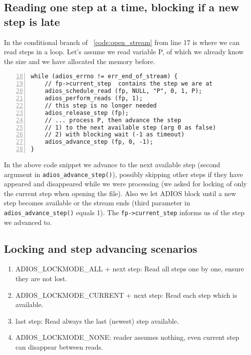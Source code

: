 \subsection{Reading one step at a time, blocking if a new step is late}
In the conditional branch of \lstlistingname~\ref{code:open_stream} from line 17 is where we can read steps in a loop. Let's assume we read variable P, of which we already know the size and we have allocated the memory before.

\begin{lstlisting}[numbers=left, numberstyle=\color{gray}, stepnumber=2,firstnumber=18,
                             caption={Read a bounding box of a variable},  label=code:stream_stepbystep]
while (adios_errno != err_end_of_stream) {
    // fp->current_step  contains the step we are at
    adios_schedule_read (fp, NULL, "P", 0, 1, P);
    adios_perform_reads (fp, 1);   
    // this step is no longer needed 
    adios_release_step (fp); 
    // ... process P, then advance the step
    // 1) to the next available step (arg 0 as false) 
    // 2) with blocking wait (-1 as timeout)
    adios_advance_step (fp, 0, -1);
}
\end{lstlisting}

\noindent In the above code snippet we advance to the next available step (second argument in \verb+adios_advance_step()+), possibly skipping other steps if they have appeared and disappeared while we were processing (we asked for locking of only the current step when opening the file). Also we let ADIOS block until a new step becomes available or the stream ends (third parameter in \verb+adios_advance_step()+ equals 1). The \verb+fp->current_step+ informs us of the step we advanced to.


\subsection{Locking and step advancing scenarios}
  \begin{enumerate}  
  \item ADIOS\_LOCKMODE\_ALL + next step: Read all steps one by one, ensure they are not lost. 
  \item ADIOS\_LOCKMODE\_CURRENT + next step: Read each step which is available. 
  \item last step: Read always the last (newest) step available.
  \item ADIOS\_LOCKMODE\_NONE: reader assumes nothing, even current step can disappear between reads.
  \end{enumerate}

